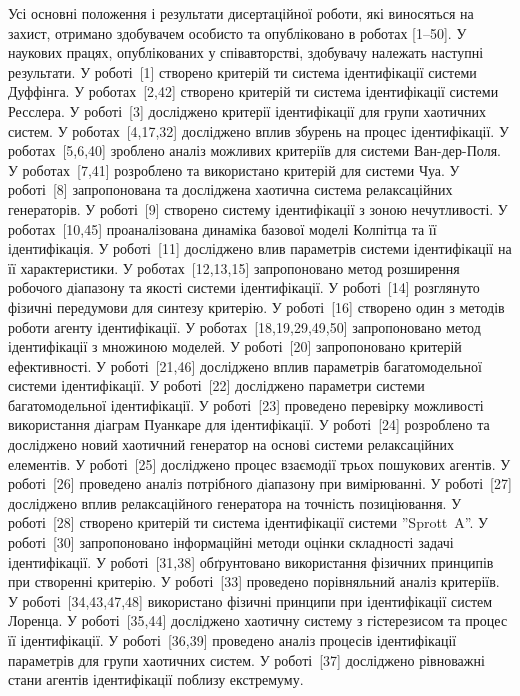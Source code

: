 \documentclass[a4paper,13pt]{atuaref}
\begin{document}
Усі основні положення і результати
дисертаційної роботи, які виносяться на захист, отримано здобувачем особисто та
опубліковано в роботах [1--50]. У наукових працях, опублікованих у співавторстві,
здобувачу належать наступні результати.
У роботі~[1] створено критерій ти система ідентифікації системи Дуффінга.
У роботах~[2,42] створено критерій ти система ідентифікації системи Ресслера.
У роботі~[3] досліджено критерії ідентифікації для групи хаотичних систем.
У роботах~[4,17,32] досліджено вплив збурень на процес ідентифікації.
У роботах~[5,6,40] зроблено аналіз можливих критеріїв для системи Ван-дер-Поля.
У роботах~[7,41] розроблено та використано критерій для системи Чуа.
У роботі~[8] запропонована та досліджена хаотична система релаксаційних генераторів.
У роботі~[9] створено систему ідентифікації з зоною нечутливості.
У роботах~[10,45] проаналізована динаміка базової моделі Колпітца та її ідентифікація.
У роботі~[11] досліджено влив параметрів системи ідентифікації на її характеристики.
У роботах~[12,13,15] запропоновано метод розширення робочого діапазону та якості системи ідентифікації.
У роботі~[14] розглянуто фізичні передумови для синтезу критерію.
У роботі~[16] створено один з методів роботи агенту ідентифікації.
У роботах~[18,19,29,49,50] запропоновано метод ідентифікації з множиною моделей.
У роботі~[20] запропоновано критерій ефективності.
У роботі~[21,46] досліджено вплив параметрів багатомодельної системи ідентифікації.
У роботі~[22] досліджено параметри системи багатомодельної ідентифікації.
У роботі~[23] проведено перевірку можливості використання діаграм Пуанкаре для ідентифікації.
У роботі~[24] розроблено та досліджено новий хаотичний генератор на основі системи релаксаційних елементів.
У роботі~[25] досліджено процес взаємодії трьох пошукових агентів.
У роботі~[26] проведено аналіз потрібного діапазону при вимірюванні.
У роботі~[27] досліджено вплив релаксаційного генератора на точність позиціювання.
У роботі~[28] створено критерій ти система ідентифікації системи ''Sprott~A''.
У роботі~[30] запропоновано інформаційні методи оцінки складності задачі ідентифікації.
У роботі~[31,38] обґрунтовано використання фізичних принципів при створенні критерію.
У роботі~[33] проведено порівняльний аналіз критеріїв.
У роботі~[34,43,47,48] використано фізичні принципи при ідентифікації систем Лоренца.
У роботі~[35,44] досліджено хаотичну систему з гістерезисом та процес її ідентифікації.
У роботі~[36,39] проведено аналіз процесів ідентифікації параметрів для групи хаотичних систем.
У роботі~[37] досліджено рівноважні стани агентів ідентифікації поблизу екстремуму.
\end{document}

